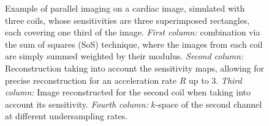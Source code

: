 



\begin{figure}[!t]
    \centering
    \resizebox*{\linewidth}{!}{}

    \caption{Example of parallel imaging on a cardiac image, simulated with three coils, whose sensitivities are three superimposed rectangles, each covering one third of the image. \textit{First column:} combination via the sum of squares (SoS) technique, where the images from each coil are simply summed weighted by their modulus. \textit{Second column:} Reconstruction taking into account the sensitivity maps, allowing for precise reconstruction for an acceleration rate $R$ up to $3$. \textit{Third column:} Image reconstructed for the second coil when taking into account its sensitivity. \textit{Fourth column:} $k$-space of the second channel at different undersampling rates. } \label{fig:parallel}
\end{figure}


